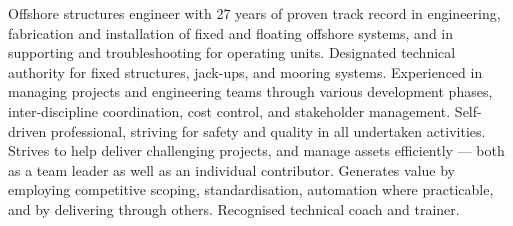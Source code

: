 \noindent Offshore structures engineer with 27 years of proven track record in engineering, fabrication and installation of fixed and floating offshore systems, and in supporting and troubleshooting for operating units. Designated technical authority for fixed structures, jack-ups, and mooring systems. Experienced in managing projects and engineering teams through various development phases, inter-discipline coordination, cost control, and stakeholder management. Self-driven professional, striving for safety and quality in all undertaken activities. Strives to help deliver challenging projects, and manage assets efficiently --- both as a team leader as well as an individual contributor. Generates value by employing competitive scoping, standardisation, automation where practicable, and by delivering through others. Recognised technical coach and trainer.